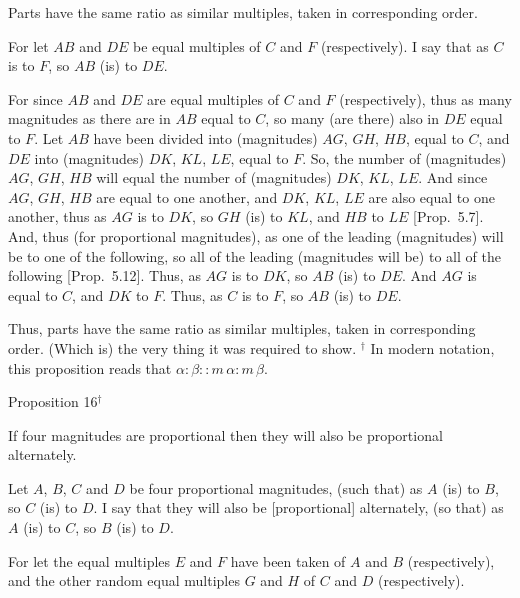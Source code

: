 Parts have the same ratio  as similar multiples,
taken in corresponding order.

\epsfysize=0.8in
\centerline{}

For let $AB$ and $DE$ be equal multiples of $C$ and $F$ (respectively). I say that
as $C$ is to $F$, so $AB$ (is) to $DE$.

For since $AB$ and $DE$ are equal multiples of $C$ and $F$ (respectively), thus
as many magnitudes as there are in $AB$ equal to $C$, so many (are there) also
in $DE$ equal to $F$. Let $AB$ have been divided into (magnitudes) $AG$, $GH$, $HB$, equal to $C$, and $DE$ into (magnitudes) $DK$, $KL$,  $LE$, equal to
$F$. So, the number of (magnitudes) $AG$, $GH$,  $HB$ will equal the number
of (magnitudes) $DK$, $KL$, $LE$.
And since $AG$, $GH$, $HB$ are equal to one another, 
and $DK$, $KL$,  $LE$ are also equal to one another,
thus as $AG$ is to
$DK$, so $GH$ (is) to $KL$, and $HB$ to $LE$ [Prop.~5.7]. And, thus (for proportional magnitudes), as one of the leading
(magnitudes) will be to one of the following, so all of the leading (magnitudes will be)
to all of the following [Prop.~5.12].
Thus, as $AG$ is to $DK$, so $AB$ (is) to $DE$. And $AG$ is equal to $C$, and 
$DK$ to $F$. Thus, as $C$ is to $F$, so $AB$ (is) to $DE$.

Thus, parts have the same ratio  as similar multiples,
taken in corresponding order. (Which is) the very thing it was required to
show.
{\footnotesize \noindent$^\dag$ In modern notation, this proposition
reads that $\alpha:\beta::m\,\alpha:m\,\beta$.}


\begin{center}
{\large Proposition 16}$^\dag$
\end{center}

If four magnitudes are proportional then they will
also be proportional alternately.

Let $A$, $B$, $C$ and $D$ be four proportional magnitudes, (such that) as $A$
(is) to $B$, so $C$ (is) to $D$. I say that they will also be [proportional]
 alternately, (so that) as $A$ (is) to $C$, so $B$ (is) to $D$.
 
For let the equal multiples $E$ and $F$ have been taken of $A$ and $B$ (respectively),
and the other random equal multiples $G$ and $H$ of $C$ and $D$ (respectively).

\epsfysize=1in
\centerline{}

